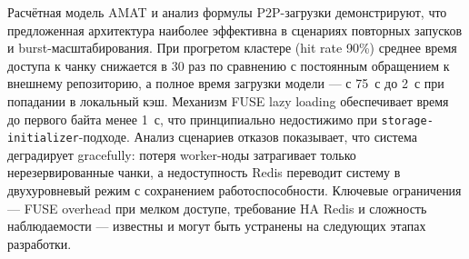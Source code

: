 Расчётная модель AMAT и анализ формулы P2P-загрузки демонстрируют, что предложенная архитектура наиболее эффективна в сценариях повторных запусков и burst-масштабирования. При прогретом кластере (hit rate 90\%) среднее время доступа к чанку снижается в 30 раз по сравнению с постоянным обращением к внешнему репозиторию, а полное время загрузки модели --- с 75~с до 2~с при попадании в локальный кэш. Механизм FUSE lazy loading обеспечивает время до первого байта менее 1~с, что принципиально недостижимо при \texttt{storage-initializer}-подходе. Анализ сценариев отказов показывает, что система деградирует gracefully: потеря worker-ноды затрагивает только нерезервированные чанки, а недоступность Redis переводит систему в двухуровневый режим с сохранением работоспособности. Ключевые ограничения --- FUSE overhead при мелком доступе, требование HA Redis и сложность наблюдаемости --- известны и могут быть устранены на следующих этапах разработки.
